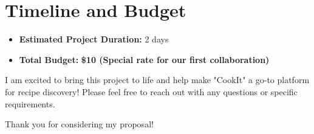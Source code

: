 \documentclass{article}
\begin{document}
\section*{Timeline and Budget}
\begin{itemize}
    \item \textbf{Estimated Project Duration:} 2 days
    \item \textbf{Total Budget:} \textbf{\$10 (Special rate for our first collaboration)}
\end{itemize}

I am excited to bring this project to life and help make "CookIt" a go-to platform for recipe discovery! Please feel free to reach out with any questions or specific requirements.

\bigskip

\noindent
Thank you for considering my proposal!
\end{document}
